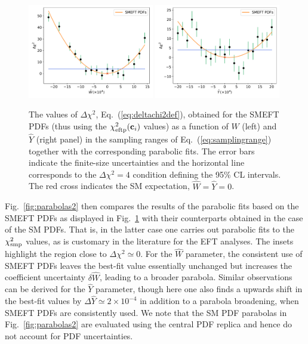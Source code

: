 \documentclass[withindex,glossary]{cam-thesis}
\begin{document}
\begin{figure}[t]
\begin{center}
  \includegraphics[width=0.49\textwidth]{dy_figures/W-smeftpdfs.pdf}
  \includegraphics[width=0.49\textwidth]{dy_figures/Y-smeftpdfs.pdf}
    \caption{\label{fig:parabolas1} The values of $\Delta \chi^2$,
      Eq.~(\ref{eq:deltachi2def}), obtained for the SMEFT PDFs (thus using the
      $\chi_{\rm eftp}^2({\mathbf{c}_i})$ values)
  as a function of $\hat{W}$ (left)
      and $\hat{Y}$ (right panel) in the sampling ranges of
      Eq.~(\ref{eq:samplingrange})
      together with the corresponding parabolic fits.
      The error bars indicate the finite-size
      uncertainties and the horizontal line corresponds to the $\Delta \chi^2=4$ condition
      defining the 95\% CL intervals.
      The red cross indicates the SM expectation, $\hat{W}=\hat{Y}=0$.
      }
\end{center}
\end{figure}

Fig.~\ref{fig:parabolas2} then compares the results
of the parabolic fits based on the SMEFT PDFs
as displayed in Fig.~\ref{fig:parabolas1} with their
counterparts
obtained in the case of the SM PDFs.
%
That is, in the latter case one carries out parabolic fits to
the $\chi^2_{{\rm smp}}$ values, as is customary
in the literature for the EFT analyses.
%
The insets highlight the region close to $\Delta\chi^2\simeq 0$.
%
For the $\hat{W}$ parameter, the consistent use of SMEFT PDFs leaves
the best-fit value essentially unchanged but increases the coefficient
uncertainty $\delta \hat{W}$, leading to a
broader parabola.
%
Similar observations can be derived for the $\hat{Y}$ parameter, though here
one also finds a upwards shift in the best-fit values by $\Delta\hat{Y}\simeq 2\times 10^{-4}$
in addition to a parabola broadening, when SMEFT PDFs are
consistently used.
%
We note that the SM PDF parabolas in Fig.~\ref{fig:parabolas2} are evaluated
using the central PDF replica and hence do not account for PDF uncertainties.
\end{document}
